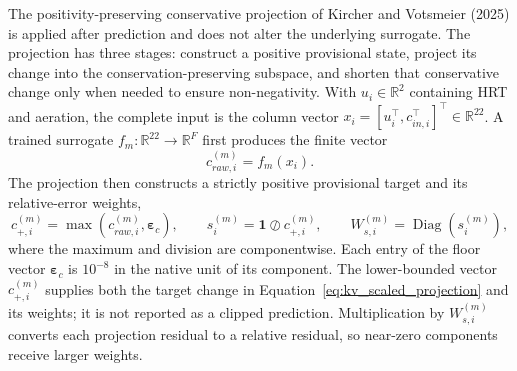 \documentclass[a4paper,fleqn]{cas-sc}
\begin{document}
The positivity-preserving conservative projection of Kircher and Votsmeier (2025) is applied after prediction and does not alter the underlying surrogate. The projection has three stages: construct a positive provisional state, project its change into the conservation-preserving subspace, and shorten that conservative change only when needed to ensure non-negativity. With $u_i\in\mathbb{R}^{2}$ containing HRT and aeration, the complete input is the column vector $x_i=[u_i^\top,c_{in,i}^\top]^\top\in\mathbb{R}^{22}$. A trained surrogate $f_m:\mathbb{R}^{22}\rightarrow\mathbb{R}^{F}$ first produces the finite vector
\begin{equation}
\label{eq:raw_component_prediction}
c_{raw,i}^{(m)}=f_m(x_i).
\end{equation}
The projection then constructs a strictly positive provisional target and its relative-error weights,
\begin{equation}
\label{eq:positive_scaling}
c_{+,i}^{(m)}=\max\!\left(c_{raw,i}^{(m)},\boldsymbol{\varepsilon}_c\right),\qquad
s_i^{(m)}=\mathbf{1}\oslash c_{+,i}^{(m)},\qquad
W_{s,i}^{(m)}=\operatorname{Diag}\!\left(s_i^{(m)}\right),
\end{equation}
where the maximum and division are componentwise. Each entry of the floor vector $\boldsymbol{\varepsilon}_c$ is $10^{-8}$ in the native unit of its component. The lower-bounded vector $c_{+,i}^{(m)}$ supplies both the target change in Equation~\eqref{eq:kv_scaled_projection} and its weights; it is not reported as a clipped prediction. Multiplication by $W_{s,i}^{(m)}$ converts each projection residual to a relative residual, so near-zero components receive larger weights.
\end{document}
